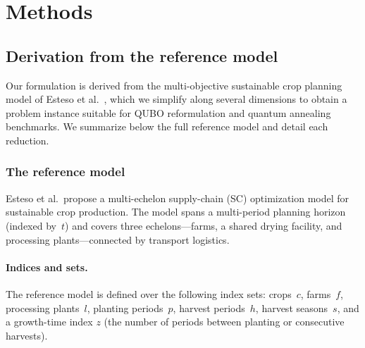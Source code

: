 \documentclass{oqireport}
\begin{document}
\section{Methods}
\label{sec:appx}





\subsection{Derivation from the reference model}
\label{sub:model_derivation}

Our formulation is derived from the multi-objective sustainable crop planning model of Esteso et al.~\cite{esteso_sustainable_2023}, which we simplify along several dimensions to obtain a problem instance suitable for QUBO reformulation and quantum annealing benchmarks. We summarize below the full reference model and detail each reduction.

\subsubsection{The reference model}

Esteso et al.\ propose a multi-echelon supply-chain (SC) optimization model for sustainable crop production.
The model spans a multi-period planning horizon (indexed by~$t$) and covers three echelons---farms, a shared drying facility, and processing plants---connected by transport logistics.

\paragraph{Indices and sets.}
The reference model is defined over the following index sets: crops~$c$, farms~$f$, processing plants~$l$, planting periods~$p$, harvest periods~$h$, harvest seasons~$s$, and a growth-time index $z$ (the number of periods between planting or consecutive harvests).
\end{document}
